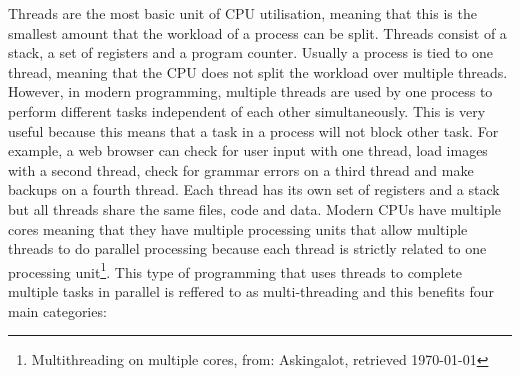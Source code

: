 Threads are the most basic unit of CPU utilisation, meaning that this is the smallest amount that the workload of a 
process can be split. Threads consist of a stack, a set of registers and a program counter. Usually a process
is tied to one thread, meaning that the CPU does not split the workload over multiple threads. However, in
modern programming, multiple threads are used by one process to perform different tasks independent of each other
simultaneously. This is very useful because this means that a task in a process will not block 
other task. For example, a web browser can check for user input with one thread, load images with a second thread,
check for grammar errors on a third thread and make backups on a fourth thread. Each thread has its own set of registers
and a stack but all threads share the same files, code and data. Modern CPUs have multiple cores meaning that they have
multiple processing units that allow multiple threads to do parallel processing because each thread is strictly
related to one processing unit\footnote{ Multithreading on multiple cores, from: Askingalot, retrieved \today }. This type of programming that uses threads to complete multiple tasks
in parallel is reffered to as multi-threading and this benefits four main categories:

